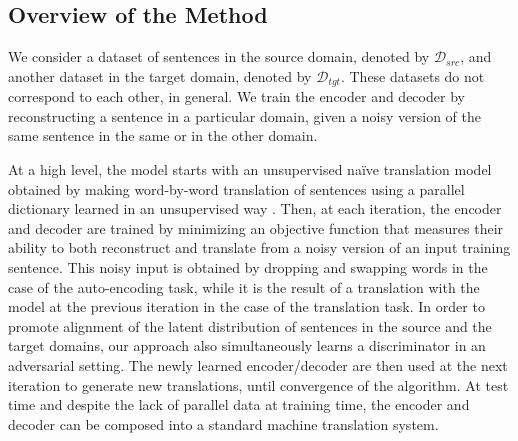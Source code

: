 \documentclass{article} \usepackage{iclr2018_conference,times}
\begin{document}
\subsection{Overview of the Method}

We consider a dataset of sentences in the source domain, denoted by $\mathcal{D}_{src}$, and another dataset in the target domain, denoted by $\mathcal{D}_{tgt}$. These datasets do not  correspond to each other, in general. We train the encoder and decoder by reconstructing a sentence in a particular domain, given a noisy version of the same sentence in the same or in the other domain. 

At a high level, the model starts with an unsupervised na\"ive translation model obtained by making word-by-word translation of sentences using a parallel dictionary learned in an unsupervised way \citep{wordalign17}. Then, at each iteration, the encoder and decoder are trained by minimizing an objective function that measures their ability 
to both reconstruct and translate from a noisy version of an input training sentence. This noisy input is obtained by dropping and swapping words in the case of the auto-encoding task, while it is the result of a translation with the model at the previous iteration in the case of the translation task. In order to promote alignment of the latent distribution of sentences in the source and the target domains, our approach also simultaneously learns a discriminator in an adversarial setting. The newly learned encoder/decoder are then used at the next iteration to generate new translations, until convergence of the algorithm. At test time and despite the lack of parallel data at training time, the encoder and decoder can be composed into a standard machine translation system. 
\end{document}

